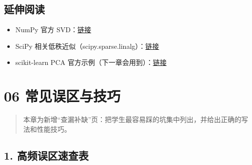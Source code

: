 \subsection{延伸阅读}\label{ux5ef6ux4f38ux9605ux8bfb-4}

\begin{itemize}
\tightlist
\item
  NumPy 官方
  SVD：\href{https://numpy.org/doc/stable/reference/generated/numpy.linalg.svd.html}{链接}
\item
  SciPy
  相关低秩近似（scipy.sparse.linalg）：\href{https://docs.scipy.org/doc/scipy/reference/sparse.linalg.html}{链接}
\item
  scikit-learn PCA
  官方示例（下一章会用到）：\href{https://scikit-learn.org/stable/auto_examples/index.html\#decomposition}{链接}
\end{itemize}

\section{06
常见误区与技巧}\label{ux5e38ux89c1ux8befux533aux4e0eux6280ux5de7}

\begin{quote}
本章为新增``查漏补缺''页：把学生最容易踩的坑集中列出，并给出正确的写法和性能技巧。
\end{quote}

\subsection{1.
高频误区速查表}\label{ux9ad8ux9891ux8befux533aux901fux67e5ux8868}

